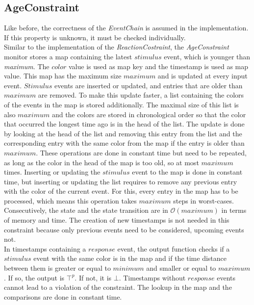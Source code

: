\subsection{AgeConstraint}
	Like before, the correctness of the \textit{EventChain} is assumed in the implementation. If this property is unknown, it must be checked individually.\\
	Similar to the implementation of the \emph{ReactionCostraint}, the \emph{AgeConstraint} monitor stores a map containing the latest $stimulus$ event, which is younger than \textit{maximum}. The $color$ value is used as map key and the timestamp is used as map value. This map has the maximum size $maximum$ and is updated at every input event. $Stimulus$ events are inserted or updated, and entries that are older than $maximum$ are removed. To make this update faster, a list containing the colors of the events in the map is stored additionally. The maximal size of this list is also $maximum$ and the colors are stored in chronological order so that the color that occurred the longest time ago is in the head of the list. The update is done by looking at the head of the list and removing this entry from the list and the corresponding entry with the same color from the map if the entry is older than $maximum$. These operations are done in constant time but need to be repeated, as long as the color in the head of the map is too old, so at most $maximum$ times. Inserting or updating the $stimulus$ event to the map is done in constant time, but inserting or updating the list requires to remove any previous entry with the color of the current event. For this, every entry in the map has to be processed, which means this operation takes $maximum$ steps in worst-cases. Consecutively, the state and the state transition are in $\mathcal{O}(maximum)$ in terms of memory and time. The creation of new timestamps is not needed in this constraint because only previous events need to be considered, upcoming events not.\\
	In timestamps containing a $response$ event, the output function checks if a $stimulus$ event with the same color is in the map and if the time distance between them is greater or equal to $minimum$ and smaller or equal to $maximum$. If so, the output is $\top^p$. If not, it is $\bot$. Timestamps without $response$ events cannot lead to a violation of the constraint. The lookup in the map and the comparisons are done in constant time.

